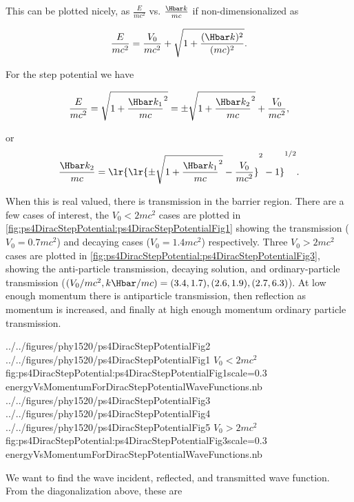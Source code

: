 This can be plotted nicely, as \( \frac{E}{m c^2} \) vs. \( \frac{\Hbar k}{m c} \) if non-dimensionalized as

\begin{dmath}\label{eqn:gradQuantumProblemSet4Problem3:580}
\frac{E}{m c^2} = \frac{V_0}{m c^2} + \sqrt{1 + \frac{(\Hbar k)^2}{(m c)^2} }.
\end{dmath}

For the step potential we have 

\begin{dmath}\label{eqn:gradQuantumProblemSet4Problem3:600}
\frac{E}{m c^2} 
= \sqrt{ 1 + {\frac{ \Hbar k_1}{m c} }^2 } 
= \pm \sqrt{ 1 + {\frac{ \Hbar k_2}{m c} }^2 } + \frac{V_0}{m c^2},
\end{dmath}

or
\begin{dmath}\label{eqn:gradQuantumProblemSet4Problem3:620}
\frac{ \Hbar k_2}{m c}
=
\lr{ \lr{ \pm \sqrt{ 1 + {\frac{ \Hbar k_1}{m c} }^2 } - \frac{V_0}{m c^2} }^2 - 1 }^{1/2}.
\end{dmath}

When this is real valued, there is transmission in the barrier region.  There are a few cases of interest, the \( V_0 < 2 m c^2 \) cases are plotted in \cref{fig:ps4DiracStepPotential:ps4DiracStepPotentialFig1} showing the transmission (\( V_0 = 0.7 m c^2 \)) and decaying cases (\( V_0 = 1.4 m c^2 \)) respectively.
Three \( V_0 > 2 m c^2 \) cases are plotted in \cref{fig:ps4DiracStepPotential:ps4DiracStepPotentialFig3}, 
showing the
anti-particle transmission,
decaying solution,
and ordinary-particle transmission
(\( (V_0/m c^2,k \Hbar/m c) = (3.4,1.7), (2.6,1.9), (2.7,6.3) \)).  At low enough momentum there is antiparticle transmission, then reflection as momentum is increased, and finally at high enough momentum ordinary particle transmission.

\mathImageTwoFigures
{../../figures/phy1520/ps4DiracStepPotentialFig2}
{../../figures/phy1520/ps4DiracStepPotentialFig1}
{\( V_0 < 2 m c^2 \)}{fig:ps4DiracStepPotential:ps4DiracStepPotentialFig1}{scale=0.3}
{energyVsMomentumForDiracStepPotentialWaveFunctions.nb}
\mathImageThreeFiguresOneLine
{../../figures/phy1520/ps4DiracStepPotentialFig3}
{../../figures/phy1520/ps4DiracStepPotentialFig4}
{../../figures/phy1520/ps4DiracStepPotentialFig5}
{\( V_0 > 2 m c^2 \)}{fig:ps4DiracStepPotential:ps4DiracStepPotentialFig3}{scale=0.3}
{energyVsMomentumForDiracStepPotentialWaveFunctions.nb}

We want to find the wave incident, reflected, and transmitted wave function.  From the diagonalization above, these are

